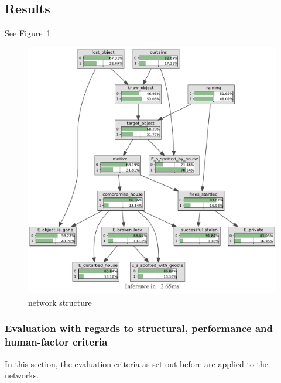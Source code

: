 \subsection{Results}

See Figure~\ref{laptop}

\begin{figure}[htbp]
\begin{center}
\includegraphics[width=\linewidth]{../experiments/StolenLaptop/bnImage/BNIMAGEStolenLaptop.pdf}
\end{center}
\caption{network structure}
\label{laptop}
\end{figure}


\subsubsection{Evaluation with regards to structural, performance and human-factor criteria}
In this section, the evaluation criteria as set out before are applied to the networks.


